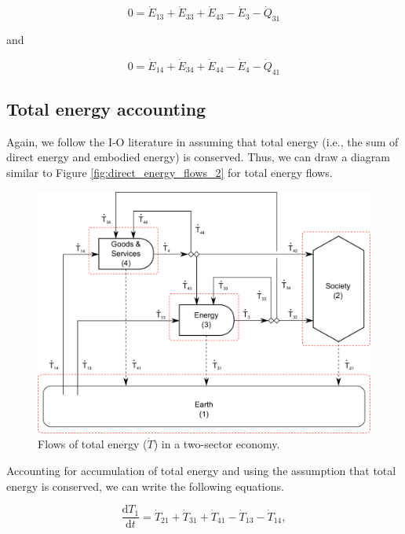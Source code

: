 \documentclass[authoryear,preprint,review,12pt]{elsarticle}
\begin{document}
\begin{equation} \label{eq:C-CV_E_dot_3_SS}
	0 = \dot{E}_{13} + \dot{E}_{33} + \dot{E}_{43} - \dot{E}_{3} - \dot{Q}_{31}
\end{equation}

\noindent and 

\begin{equation} \label{eq:C-CV_E_dot_4_SS}
	0 = \dot{E}_{14} + \dot{E}_{34} + \dot{E}_{44} - \dot{E}_4 - \dot{Q}_{41}
\end{equation}

\subsection{Total energy accounting}

Again, we follow the I-O literature in assuming that total energy (i.e., the sum of direct energy and embodied energy) is conserved. Thus, we can draw a diagram similar to Figure \ref{fig:direct_energy_flows_2} for total energy flows.

\begin{figure}[h!]
\includegraphics[width=1.0\linewidth]{images/I-O_three_sector_total_energy.pdf}
\caption{Flows of total energy ($\dot{T}$) in a two-sector economy.}
\label{fig:total_energy_flows_2S}
\end{figure}

Accounting for accumulation of total energy and using the assumption that total energy is conserved, we can write the following equations.

\begin{equation} \label{eq:C-CV_T_1}
	\frac{\mathrm{d}T_{1}}{\mathrm{d}t} 	 = \dot{T}_{21} + \dot{T}_{31} + \dot{T}_{41} - \dot{T}_{13} - \dot{T}_{14},
\end{equation}
\end{document}
